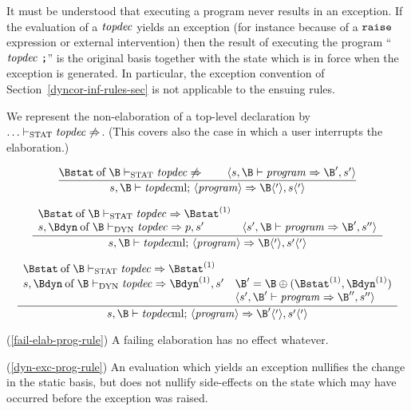 It must be understood  that executing a program never results in an
exception. If the evaluation of a ${\it topdec}$ yields an exception 
(for instance because of a ${\tt raise}$ expression or external intervention) then
the result of executing the program ``${\it topdec}\ \mbox{{\tt ;}}$'' is the
original basis together with the state which is in force when the exception is
generated. In particular, the exception convention of 
Section~\ref{dyncor-inf-rules-sec}
is not applicable to the ensuing rules.

We represent the non-elaboration of a top-level declaration by\linebreak
$\ldots\vdash_{\rm STAT}{\it topdec}\not\Rightarrow$. (This covers also the case in which a 
user interrupts the elaboration.)

\begin{equation}            %
\label{fail-elab-prog-rule}
\frac{\of{\Bstat}{\B}\tsstat\topdec\not\ra\qquad
      \langle\s,\B\ts\program\ra\B',s'\rangle}
     {\s,\B\ts\longprog\ra\B\langle'\rangle,s\langle'\rangle}\index{65.2}
\end{equation}

\begin{equation}            %
\label{dyn-exc-prog-rule}
\frac{\begin{array}{lr}
      \of{\Bstat}{\B}\tsstat\topdec\ra\Bstat^{(1)} & \\
      \s,\of{\Bdyn}{\B}\tsdyn\topdec\ra\p,\s' &
                  \langle\s',\B\ts\program\ra\B',\s''\rangle
      \end{array}}
     {\s,\B\ts\longprog\ra\B\langle'\rangle,\s'\langle'\rangle}
\end{equation}

\begin{equation}            %
\label{success-prog-rule}
\frac{\begin{array}{ll}
       \of{\Bstat}{\B}\tsstat\topdec\ra\Bstat^{(1)} & \\
       \s,\of{\Bdyn}{\B}\tsdyn\topdec\ra\Bdyn^{(1)},s'&
                   \B'=\B\oplus(\Bstat^{(1)},\Bdyn^{(1)})\\
       &           \langle\s',\B'\ts\program\ra\B'',s''\rangle
      \end{array}
      }
      {\s,\B\ts\longprog\ra\B'\langle'\rangle,\s'\langle'\rangle}
\end{equation}
\comments
\begin{description}
\item{(\ref{fail-elab-prog-rule})}
  A failing elaboration has no effect whatever.
\item{(\ref{dyn-exc-prog-rule})}
  An evaluation which yields an exception nullifies
the change in the static basis, but does not
nullify side-effects on the state which may have occurred
before the exception was raised.
\end{description}
